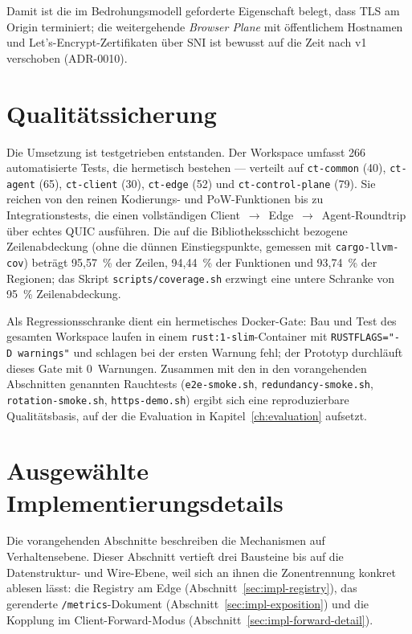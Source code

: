Damit ist die im Bedrohungsmodell geforderte Eigenschaft belegt, dass TLS am
Origin terminiert; die weitergehende \emph{Browser Plane} mit öffentlichem
Hostnamen und Let's-Encrypt-Zertifikaten über SNI ist bewusst auf die Zeit nach
v1 verschoben (ADR-0010).

\section{Qualitätssicherung}
\label{sec:impl-qualitaet}

Die Umsetzung ist testgetrieben entstanden. Der Workspace umfasst 266
automatisierte Tests, die hermetisch bestehen --- verteilt auf \texttt{ct-common}
(40), \texttt{ct-agent} (65), \texttt{ct-client} (30), \texttt{ct-edge} (52) und
\texttt{ct-control-plane} (79). Sie reichen von den reinen Kodierungs- und
PoW-Funktionen bis zu Integrationstests, die einen vollständigen
Client~$\rightarrow$~Edge~$\rightarrow$~Agent-Roundtrip über echtes QUIC
ausführen. Die auf die Bibliotheksschicht bezogene Zeilenabdeckung (ohne die
dünnen Einstiegspunkte, gemessen mit \texttt{cargo-llvm-cov}) beträgt
95,57~\% der Zeilen, 94,44~\% der Funktionen und 93,74~\% der Regionen; das
Skript \texttt{scripts/coverage.sh} erzwingt eine untere Schranke von 95~\%
Zeilenabdeckung.

Als Regressionsschranke dient ein hermetisches Docker-Gate: Bau und Test des
gesamten Workspace laufen in einem \texttt{rust:1-slim}-Container mit
\texttt{RUSTFLAGS="-D\ warnings"} und schlagen bei der ersten Warnung fehl; der
Prototyp durchläuft dieses Gate mit 0~Warnungen. Zusammen mit den in den
vorangehenden Abschnitten genannten Rauchtests
(\texttt{e2e-smoke.sh}, \texttt{redundancy-smoke.sh}, \texttt{rotation-smoke.sh},
\texttt{https-demo.sh}) ergibt sich eine reproduzierbare Qualitätsbasis, auf der
die Evaluation in Kapitel~\ref{ch:evaluation} aufsetzt.

\section{Ausgewählte Implementierungsdetails}
\label{sec:impl-details}

Die vorangehenden Abschnitte beschreiben die Mechanismen auf Verhaltensebene.
Dieser Abschnitt vertieft drei Bausteine bis auf die Datenstruktur- und
Wire-Ebene, weil sich an ihnen die Zonentrennung konkret ablesen lässt: die
Registry am Edge (Abschnitt~\ref{sec:impl-registry}), das gerenderte
\texttt{/metrics}-Dokument (Abschnitt~\ref{sec:impl-exposition}) und die
Kopplung im Client-Forward-Modus (Abschnitt~\ref{sec:impl-forward-detail}).

